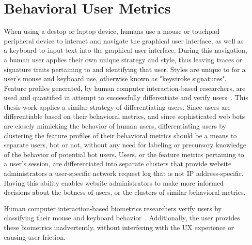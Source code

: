 
\section{Behavioral User Metrics}\label{sec:behavrioral-user-metrics}
When using a destop or laptop device, humans use a mouse or touchpad peripheral device to interact and navigate the graphical user interface, as well as a keyboard to input text into the graphical user interface.
During this navigation, a human user applies their own unique strategy and style, thus leaving traces or signature traits pertaining to and identifying that user.
Styles are unique to for a user's mouse and keyboard use, otherwise known as "keystroke signatures".
Feature profiles generated, by human computer interaction-based researchers, are used and quantified in attempt to successfully differentiate and verify users~\cite{human_computer_interaction_based_intrusion_detection}.
This thesis work applies a similar strategy of differentiating users.
Since users are differentiable based on their behavioral metrics, and since sophisticated web bots are closely mimicking the behavior of human users, differentiating users by clustering the feature profiles of their behavioral metrics should be a means to separate users, bot or not, without any need for labeling or precursory knowledge of the behavior of potential bot users.
Users, or the feature metrics pertaining to a user's session, are differentiated into separate clusters that provide website administrators a user-specific network request log that is not IP address-specific.
Having this ability enables website administrators to make more informed decisions about the botness of users, or the clusters of similar behavioral metrics.

Human computer interaction-based biometrics researchers verify users by classifying their mouse and keyboard behavior~\cite{human_computer_interaction_based_intrusion_detection}.
Additionally, the user provides these biometrics inadvertently, without interfering with the UX experience or causing user friction.


